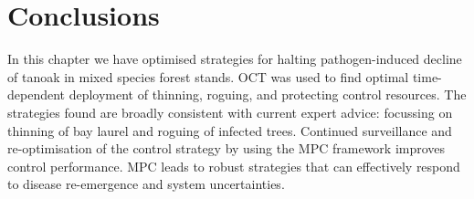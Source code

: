 \section{Conclusions\label{sec:ch6:conclusions}}

In this chapter we have optimised strategies for halting pathogen-induced decline of tanoak in mixed species forest stands. OCT was used to find optimal time-dependent deployment of thinning, roguing, and protecting control resources. The strategies found are broadly consistent with current expert advice: focussing on thinning of bay laurel and roguing of infected trees. Continued surveillance and re-optimisation of the control strategy by using the MPC framework improves control performance. MPC leads to robust strategies that can effectively respond to disease re-emergence and system uncertainties.
